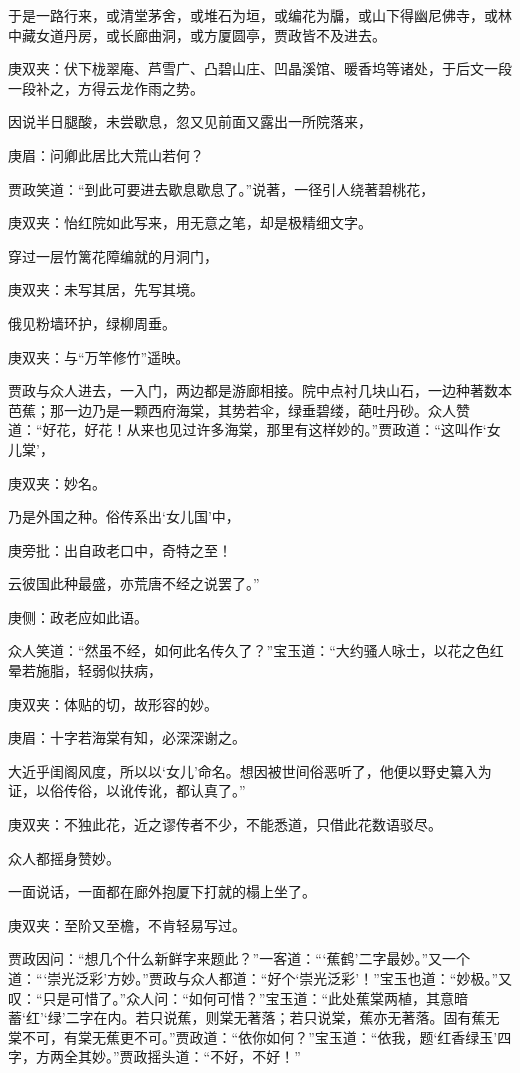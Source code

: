 \begin{parag}
    于是一路行来，或清堂茅舍，或堆石为垣，或编花为牖，或山下得幽尼佛寺，或林中藏女道丹房，或长廊曲洞，或方厦圆亭，贾政皆不及进去。\begin{note}庚双夹：伏下栊翠庵、芦雪广、凸碧山庄、凹晶溪馆、暖香坞等诸处，于后文一段一段补之，方得云龙作雨之势。\end{note}因说半日腿酸，未尝歇息，忽又见前面又露出一所院落来，\begin{note}庚眉：问卿此居比大荒山若何？\end{note}贾政笑道：“到此可要进去歇息歇息了。”说著，一径引人绕著碧桃花，\begin{note}庚双夹：怡红院如此写来，用无意之笔，却是极精细文字。\end{note}穿过一层竹篱花障编就的月洞门，\begin{note}庚双夹：未写其居，先写其境。\end{note}俄见粉墙环护，绿柳周垂。\begin{note}庚双夹：与“万竿修竹”遥映。\end{note}贾政与众人进去，一入门，两边都是游廊相接。院中点衬几块山石，一边种著数本芭蕉；那一边乃是一颗西府海棠，其势若伞，绿垂碧缕，葩吐丹砂。众人赞道：“好花，好花！从来也见过许多海棠，那里有这样妙的。”贾政道：“这叫作‘女儿棠’，\begin{note}庚双夹：妙名。\end{note}乃是外国之种。俗传系出‘女儿国’中，\begin{note}庚旁批：出自政老口中，奇特之至！\end{note}云彼国此种最盛，亦荒唐不经之说罢了。”\begin{note}庚侧：政老应如此语。\end{note}众人笑道：“然虽不经，如何此名传久了？”宝玉道：“大约骚人咏士，以花之色红晕若施脂，轻弱似扶病，\begin{note}庚双夹：体贴的切，故形容的妙。\end{note}\begin{note}庚眉：十字若海棠有知，必深深谢之。\end{note}大近乎闺阁风度，所以以‘女儿’命名。想因被世间俗恶听了，他便以野史纂入为证，以俗传俗，以讹传讹，都认真了。”\begin{note}庚双夹：不独此花，近之谬传者不少，不能悉道，只借此花数语驳尽。\end{note}众人都摇身赞妙。
\end{parag}


\begin{parag}
    一面说话，一面都在廊外抱厦下打就的榻上坐了。\begin{note}庚双夹：至阶又至檐，不肯轻易写过。\end{note}贾政因问：“想几个什么新鲜字来题此？”一客道：“‘蕉鹤’二字最妙。”又一个道：“‘崇光泛彩’方妙。”贾政与众人都道：“好个‘崇光泛彩’！”宝玉也道：“妙极。”又叹：“只是可惜了。”众人问：“如何可惜？”宝玉道：“此处蕉棠两植，其意暗蓄‘红’‘绿’二字在内。若只说蕉，则棠无著落；若只说棠，蕉亦无著落。固有蕉无棠不可，有棠无蕉更不可。”贾政道：“依你如何？”宝玉道：“依我，题‘红香绿玉’四字，方两全其妙。”贾政摇头道：“不好，不好！”
\end{parag}


